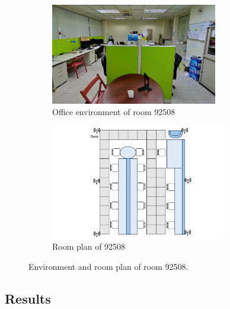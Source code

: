\documentclass[a4paper,12pt]{report}
\begin{document}
\begin{figure}[tbph]%
    \begin{subfigure}{1\linewidth}
    \centering
        \includegraphics[width=0.8\textwidth]{images/5_4_Different_Environments_picture.jpg}
        \caption{Office environment of room 92508}
        \label{figure:5_4_Different_Environments_picture}
    \end{subfigure}
    \begin{subfigure}{1\linewidth}
    \centering
        \includegraphics[width=0.85\textwidth]{images/5_4_Different_Environments_plan.png}
        \caption{Room plan of 92508}
        \label{figure:5_4_Different_Environments_plan}
    \end{subfigure}
\caption{Environment and room plan of room 92508.}
\label{figure:5_4_Different_Environments}
\end{figure}

\subsection{Results}
\end{document}
